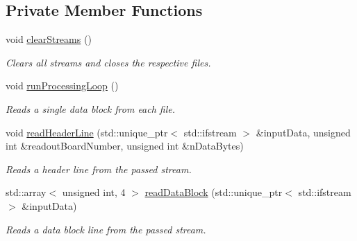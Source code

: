\subsection*{Private Member Functions}
\begin{DoxyCompactItemize}
\item 
void \hyperlink{class_file_reader_abf01d994f77beae0653de481ea739ebb}{clear\+Streams} ()
\begin{DoxyCompactList}\small\item\em Clears all streams and closes the respective files. \end{DoxyCompactList}\item 
void \hyperlink{class_file_reader_a98606ec7d315f1ed6f90c531df0d09f9}{run\+Processing\+Loop} ()
\begin{DoxyCompactList}\small\item\em Reads a single data block from each file. \end{DoxyCompactList}\item 
void \hyperlink{class_file_reader_a94a71d0a05ececd1e84fa71d80b7e6ba}{read\+Header\+Line} (std\+::unique\+\_\+ptr$<$ std\+::ifstream $>$ \&input\+Data, unsigned int \&readout\+Board\+Number, unsigned int \&n\+Data\+Bytes)
\begin{DoxyCompactList}\small\item\em Reads a header line from the passed stream. \end{DoxyCompactList}\item 
std\+::array$<$ unsigned int, 4 $>$ \hyperlink{class_file_reader_ac578b683eba751027766a2c30f03a28b}{read\+Data\+Block} (std\+::unique\+\_\+ptr$<$ std\+::ifstream $>$ \&input\+Data)
\begin{DoxyCompactList}\small\item\em Reads a data block line from the passed stream. \end{DoxyCompactList}\end{DoxyCompactItemize}
